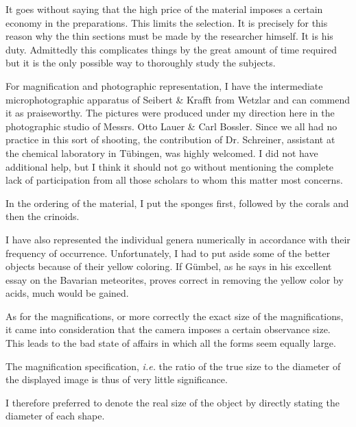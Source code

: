 \documentclass[a4paper, 12pt, oneside]{article}
\begin{document}
It goes without saying that the high price of the material imposes a certain economy in the preparations. This limits the selection. It is precisely for this reason why the thin sections must be made by the researcher himself. It is his duty. Admittedly this complicates things by the great amount of time required but it is the only possible way to thoroughly study the subjects.

For magnification and photographic representation, I have the intermediate microphotographic apparatus of Seibert \& Krafft from Wetzlar and can commend it as praiseworthy. The pictures were produced under my direction here in the photographic studio of Messrs. Otto Lauer \& Carl Bossler. Since we all had no practice in this sort of shooting, the contribution of Dr. Schreiner, assistant at the chemical laboratory in Tübingen, was highly welcomed. I did not have additional help, but I think it should not go without mentioning the complete lack of participation from all those scholars to whom this matter most concerns.

In the ordering of the material, I put the sponges first, followed by the corals and then the crinoids.

I have also represented the individual genera numerically in accordance with their frequency of occurrence. Unfortunately, I had to put aside some of the better objects because of their yellow coloring. If Gümbel, as he says in his excellent essay on the Bavarian meteorites, proves correct in removing the yellow color by acids, much would be gained.

As for the magnifications, or more correctly the exact size of the magnifications, it came into consideration that the camera imposes a certain observance size. This leads to the bad state of affairs in which all the forms seem equally large.

The magnification specification, \emph{i.e.} the ratio of the true size to the diameter of the displayed image is thus of very little significance.

I therefore preferred to denote the real size of the object by directly stating the diameter of each shape.
\clearpage
\end{document}

